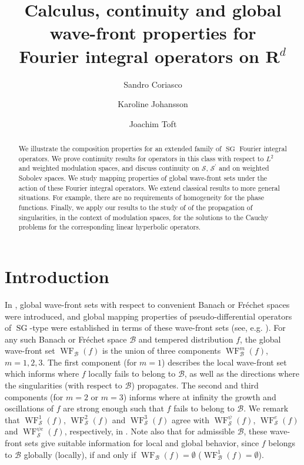 \documentclass[12pt,a4paper,reqno]{amsart}
\author{Sandro Coriasco}
\author{Karoline Johansson}
\author{Joachim Toft}
\title{Calculus, continuity and global wave-front
properties for\\ Fourier integral operators on ${\mathbf R^{{d}}}$}
\numberwithin{equation}{section}
\numberwithin{thm}{section}
\theoremstyle{definition}
\theoremstyle{remark}
\begin{document}
\begin{abstract}
We illustrate the composition properties 
for an extended family of ${\operatorname{SG}}$
Fourier integral operators.
We prove continuity results for
operators in this class with respect to $L^2$
and weighted modulation spaces, 
and discuss continuity
on ${{\mathscr S}}$, ${{\mathscr S}}^\prime$ and on 
weighted Sobolev spaces. We 
study mapping properties of global wave-front sets under the action of
these Fourier integral operators. We extend classical results to 
more general situations. For example, there are no requirements of homogeneity for the phase functions. 
Finally, we apply our results to the study of of the propagation of singularities,
in the context of modulation spaces, for the solutions to the
Cauchy problems for the corresponding linear hyperbolic operators.
\end{abstract}

\maketitle

\setcounter{tocdepth}{1}

\tableofcontents

\section{Introduction}\label{sec0}

\par

In \cite{CJT2}, global wave-front sets with respect to convenient Banach or
Fr\'{e}chet spaces were introduced, and global mapping properties of
pseudo-differential operators of ${\operatorname{SG}}$-type
were established in terms of these wave-front sets (see, e.g.
\cite{Co, coriasco, CJT1, CJT2, CJT3, CoMa, CoPa, Me, Sc}).
For any such Banach or Fr\'{e}chet space ${{\mathcal B}}$ and
tempered distribution $f$, the global wave-front set ${\operatorname{WF}} _{{\mathcal B}}(f)$ is the
union of three components ${\operatorname{WF}} _{{\mathcal B}}^m(f)$, $m=1,2,3$. The first
component (for $m=1$) describes the local wave-front set which informs
where $f$ locally fails to belong to ${{\mathcal B}}$, as well as the directions where
the singularities (with respect to ${{\mathcal B}}$) propagates. The second and third
components (for $m=2$ or $m=3$) informs where at infinity the growth and
oscillations of $f$ are strong enough such that $f$ fails to belong to ${{\mathcal B}}$.
We remark that ${\operatorname{WF}} _{{\mathscr S}}^1(f)$, ${\operatorname{WF}} _{{\mathscr S}}^2(f)$ and ${\operatorname{WF}}
_{{\mathscr S}}^3(f)$ agree with ${\operatorname{WF}} _{{\mathscr S}}^\psi (f)$, ${\operatorname{WF}} _{{\mathscr S}}^e(f)$ and
${\operatorname{WF}} _{{\mathscr S}}^{\psi e}(f)$, respectively, in \cite{CoMa}.
Note also that for admissible ${{\mathcal B}}$, these wave-front sets give suitable
information for local and global behavior, since $f$ belongs to ${{\mathcal B}}$
globally (locally), if and only if ${\operatorname{WF}} _{{\mathcal B}}(f)=\emptyset$ (${\operatorname{WF}}
_{{\mathcal B}}^1(f)=\emptyset$).
\end{document}
